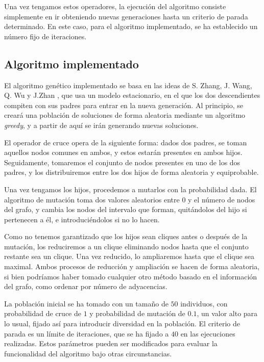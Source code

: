 Una vez tengamos estos operadores, la ejecución del algoritmo consiste simplemente
en ir obteniendo nuevas generaciones hasta un criterio de parada determinado.
En este caso, para el algoritmo implementado, se ha establecido un número fijo de
iteraciones.

\subsection{Algoritmo implementado}\label{alg-genetico}

El algoritmo genético implementado se basa en las ideas de S. Zhang, J. Wang, Q. Wu
y J.Zhan \citep{zhang:2014}, que usa un modelo estacionario, en el que los dos
descendientes compiten con sus padres para entrar en la nueva generación.
Al principio, se creará una población de soluciones de forma aleatoria mediante
un algoritmo \textit{greedy}, y a partir de aquí se irán generando nuevas soluciones.

El operador de cruce opera de la siguiente forma: dados dos padres, se toman aquellos
nodos comunes en ambos, y estos estarán presentes en ambos hijos. Seguidamente,
tomaremos el conjunto de nodos presentes en uno de los dos padres, y los distribuiremos
entre los dos hijos de forma aleatoria y equiprobable.

Una vez tengamos los hijos, procedemos a mutarlos con la probabilidad dada. El
algoritmo de mutación toma dos valores aleatorios entre $0$ y el número de nodos
del grafo, y cambia los nodos del intervalo que forman, quitándolos del hijo si
pertenecen a él, e introduciéndolos si no lo hacen.

Como no tenemos garantizado que los hijos sean cliques antes o después de la mutación,
los reduciremos a un clique eliminando nodos hasta que el conjunto restante sea un
clique. Una vez reducido, lo ampliaremos hasta que el clique sea maximal.
Ambos procesos de reducción y ampliación se hacen de forma aleatoria, si bien
podríamos haber tomado cualquier otro método basado en el información del grafo,
como ordenar por número de adyacencias.

La población inicial se ha tomado con un tamaño de $50$ individuos, con probabilidad
de cruce de $1$ y probabilidad de mutación de $0.1$, un valor alto para lo usual,
fijado así para introducir diversidad en la población. El criterio de parada es un
límite de iteraciones, que se ha fijado a $40$ en las ejecuciones realizadas.
Estos parámetros pueden ser modificados para evaluar la funcionalidad del algoritmo
bajo otras circunstancias.

